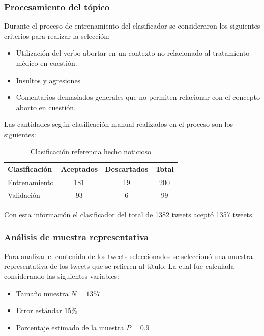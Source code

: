 \subsubsection{Procesamiento del tópico}

Durante el proceso de entrenamiento del clasificador se consideraron los siguientes criterios para realizar la selección:

\begin{itemize}
	\item Utilización del verbo abortar en un contexto no relacionado al tratamiento médico en cuestión.
	\item Insultos y agresiones 
	\item Comentarios demasiados generales que no permiten relacionar con el concepto aborto en cuestión.
\end{itemize}

Las cantidades según clasificación manual realizados en el proceso son los siguientes:

\begin{table}[H]
	\centering
	\begin{tabular}{| l | c | c | c |}
		\hline
		Clasificación    & Aceptados & Descartados & Total \\ \hline
		Entrenamiento    & 181 & 19 & 200\\ \hline
		Validación		 & 93 & 6 & 99\\ \hline
	\end{tabular}
	\caption {Clasificación referencia hecho noticioso}
\end{table}

Con esta información el clasificador del total de 1382 tweets aceptó 1357 tweets. \\

\subsubsection{Análisis de muestra representativa}

Para analizar el contenido de los tweets seleccionados se seleccionó una muestra representativa de los tweets que se refieren al título. La cual fue calculada considerando las siguientes variables:

\begin{itemize}
	\item Tamaño muestra $N = 1357$
	\item Error estándar $15\%$	
	\item Porcentaje estimado de la muestra $P = 0.9$
\end{itemize}

